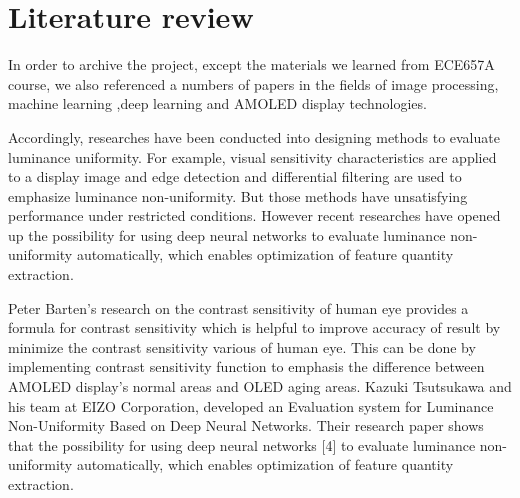 \documentclass[runningheads]{llncs}
\begin{document}
\section{Literature review}
In order to archive the project, except the materials we learned from ECE657A course, we also referenced a numbers of papers in the fields of image processing, machine learning ,deep learning and AMOLED display technologies.

Accordingly, researches have been conducted into designing methods to evaluate luminance uniformity. For example, visual sensitivity characteristics are applied to a display image \cite{doi:10.1889,5985739,Kunihiko} and edge detection\cite{Chen_2007,ROVAMO19992387} and differential filtering \cite{doi:10.1002/sdtp.13087} are used to emphasize luminance non-uniformity. But those methods have unsatisfying performance under restricted conditions. However recent researches have opened up the possibility for using deep neural networks \cite{doi:10.1002/sdtp.13087} to evaluate luminance non-uniformity automatically, which enables optimization of feature quantity extraction.

Peter Barten’s research on the contrast sensitivity of human eye \cite{barten2003formula} provides a formula for contrast sensitivity which is helpful to improve accuracy of result by minimize the contrast sensitivity various of human eye. This can be done by implementing contrast sensitivity function to emphasis the difference between AMOLED display's normal areas and OLED aging areas.
Kazuki Tsutsukawa and his team at EIZO Corporation, developed an Evaluation system for Luminance Non-Uniformity Based on Deep Neural Networks\cite{doi:10.1002/sdtp.13087}. Their research paper shows that the possibility for using deep neural networks [4] to evaluate luminance non-uniformity automatically, which enables optimization of feature quantity extraction.
%
%
\end{document}
